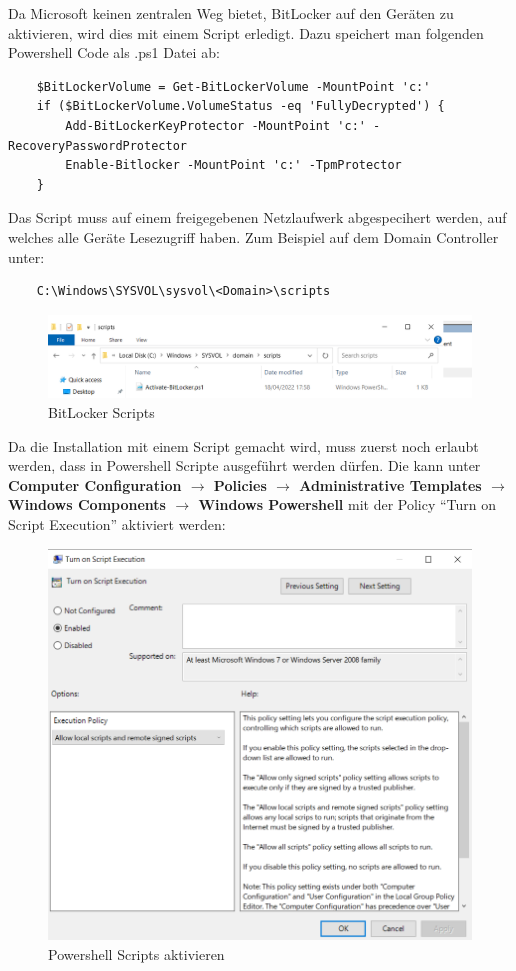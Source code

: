 Da Microsoft keinen zentralen Weg bietet, BitLocker auf den Geräten zu aktivieren, wird dies mit einem Script erledigt.
Dazu speichert man folgenden Powershell Code als .ps1 Datei ab:
\begin{lstlisting}
    $BitLockerVolume = Get-BitLockerVolume -MountPoint 'c:'
    if ($BitLockerVolume.VolumeStatus -eq 'FullyDecrypted') {
        Add-BitLockerKeyProtector -MountPoint 'c:' -RecoveryPasswordProtector
        Enable-Bitlocker -MountPoint 'c:' -TpmProtector
    }
\end{lstlisting}
Das Script muss auf einem freigegebenen Netzlaufwerk abgespecihert werden, auf welches alle Geräte Lesezugriff haben.
Zum Beispiel auf dem Domain Controller unter:
\begin{lstlisting}
    C:\Windows\SYSVOL\sysvol\<Domain>\scripts
\end{lstlisting}
\begin{figure}[H]
    \centering
    \includegraphics[width=\linewidth]{../img/Encryption/activate-bitlocker-script.png}
    \caption{BitLocker Scripts}
\end{figure}

Da die Installation mit einem Script gemacht wird, muss zuerst noch erlaubt werden, dass in Powershell Scripte ausgeführt werden dürfen.
Die kann unter \textbf{Computer Configuration $\rightarrow$ Policies $\rightarrow$ Administrative Templates $\rightarrow$ Windows Components $\rightarrow$ Windows Powershell} mit der Policy ``Turn on Script Execution'' aktiviert werden:
\begin{figure}[H]
    \centering
    \includegraphics[width=\linewidth]{../img/Encryption/powershell-execution.png}
    \caption{Powershell Scripts aktivieren}
\end{figure}


